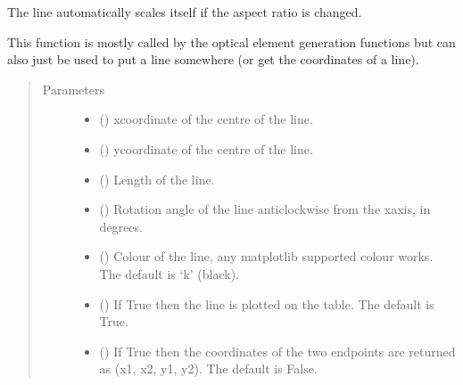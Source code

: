 \documentclass[letterpaper,10pt,english]{sphinxmanual}
\begin{document}
\begin{fulllineitems}
\begin{fulllineitems}
\sphinxAtStartPar
The line automatically scales itself if the aspect ratio is changed.

\sphinxAtStartPar
This function is mostly called by the optical element generation functions
but can also just be used to put a line somewhere (or get the coordinates of a line).
\begin{quote}\begin{description}
\item[{Parameters}] \leavevmode\begin{itemize}
\item {} 
\sphinxAtStartPar
{} () \textendash{} x\sphinxhyphen{}coordinate of the centre of the line.

\item {} 
\sphinxAtStartPar
{} () \textendash{} y\sphinxhyphen{}coordinate of the centre of the line.

\item {} 
\sphinxAtStartPar
{} () \textendash{} Length of the line.

\item {} 
\sphinxAtStartPar
{} () \textendash{} Rotation angle of the line anticlockwise from the x\sphinxhyphen{}axis, in degrees.

\item {} 
\sphinxAtStartPar
{} (\sphinxstyleliteralemphasis{\sphinxupquote{, }}) \textendash{} Colour of the line, any matplotlib supported colour works.
The default is ‘k’ (black).

\item {} 
\sphinxAtStartPar
{} (\sphinxstyleliteralemphasis{\sphinxupquote{, }}) \textendash{} If True then the line is plotted on the table. The default is True.

\item {} 
\sphinxAtStartPar
{} (\sphinxstyleliteralemphasis{\sphinxupquote{, }}) \textendash{} If True then the coordinates of the two endpoints are returned as
(x1, x2, y1, y2). The default is False.


\end{itemize}
\end{description}
\end{quote}
\end{fulllineitems}
\end{fulllineitems}
\end{document}
